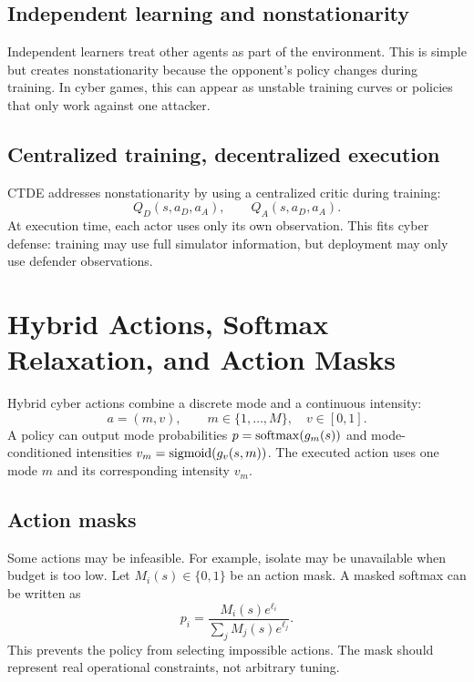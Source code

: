 \documentclass[11pt,a4paper]{article}
\begin{document}
\subsection{Independent learning and nonstationarity}
Independent learners treat other agents as part of the environment. This is simple but creates nonstationarity because the opponent's policy changes during training. In cyber games, this can appear as unstable training curves or policies that only work against one attacker.

\subsection{Centralized training, decentralized execution}
CTDE addresses nonstationarity by using a centralized critic during training:
\begin{equation}
    Q_D(s,a_D,a_A),\qquad Q_A(s,a_D,a_A).
\end{equation}
At execution time, each actor uses only its own observation. This fits cyber defense: training may use full simulator information, but deployment may only use defender observations.

\section{Hybrid Actions, Softmax Relaxation, and Action Masks}\label{app:hybrid-actions}
Hybrid cyber actions combine a discrete mode and a continuous intensity:
\begin{equation}
    a=(m,v),\qquad m\in\{1,\ldots,M\},\quad v\in[0,1].
\end{equation}
A policy can output mode probabilities $p=\operatorname{softmax}(g_m(s))$ and mode-conditioned intensities $v_m=\operatorname{sigmoid}(g_v(s,m))$. The executed action uses one mode $m$ and its corresponding intensity $v_m$.

\subsection{Action masks}
Some actions may be infeasible. For example, isolate may be unavailable when budget is too low. Let $M_i(s)\in\{0,1\}$ be an action mask. A masked softmax can be written as
\begin{equation}
    p_i=\frac{M_i(s)e^{\ell_i}}{\sum_j M_j(s)e^{\ell_j}}.
\end{equation}
This prevents the policy from selecting impossible actions. The mask should represent real operational constraints, not arbitrary tuning.
\end{document}
